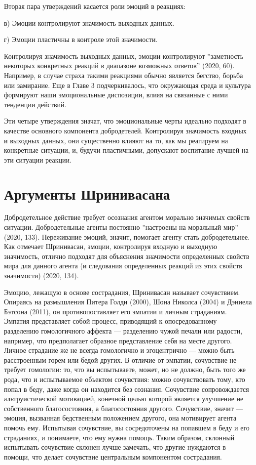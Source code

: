 \documentclass[11pt]{book}
\begin{document}
Вторая пара утверждений касается роли эмоций в реакциях:

в) Эмоции контролируют значимость выходных данных.

г) Эмоции пластичны в контроле этой значимости.

Контролируя значимость выходных данных, эмоции контролируют ''заметность некоторых конкретных реакций в диапазоне возможных ответов'' (2020, 60). Например, в случае страха такими реакциями обычно является бегство, борьба или замирание. Еще в Главе 3 подчеркивалось, что окружающая среда и культура формируют наши эмоциональные диспозиции, влияя на связанные с ними тенденции действий.

Эти четыре утверждения значат, что эмоциональные черты идеально подходят в качестве основного компонента добродетелей. Контролируя значимость входных и выходных данных, они существенно влияют на то, как мы реагируем на конкретные ситуации, и, будучи пластичными, допускают воспитание лучшей на эти ситуации реакции.

\section{Аргументы Шринивасана}

Добродетельное действие требует осознания агентом морально значимых свойств ситуации. Добродетельные агенты постоянно ''настроены на моральный мир'' (2020, 133). Переживание эмоций, значит, помогает агенту стать добродетельнее. Как отмечает Шринивасан, эмоции, контролируя входную и выходную значимость, отлично подходят для объяснения значимости определенных свойств мира для данного агента (и следования определенных реакций из этих свойств значимости) (2020, 134).

Эмоцию, лежащую в основе сострадания, Шринивасан называет сочувствием. Опираясь на размышления Питера Голди (2000), Шона Николса (2004) и Дэниела Бэтсона (2011), он противопоставляет его эмпатии и личным страданиям. Эмпатия представляет собой процесс, приводящий к опосредованному разделению гомологичного аффекта --- разделению чужой печали или радости, например, что предполагает образное представление себя на месте другого. Личное страдание же не всегда гомологично и эгоцентрично --- можно быть расстроенным горем или бедой других. В отличие от эмпатии, сочувствие не требует гомологии: то, что вы испытываете, может, но не должно, быть того же рода, что и испытываемое объектом сочувствия: можно сочувствовать тому, кто попал в беду, даже когда он находится без сознания. Сочувствие сопровождается альтруистической мотивацией, конечной целью которой является улучшение не собственного благосостояния, а благосостояния другого. Сочувствие, значит --- эмоция, вызванная бедственным положением другого, она мотивирует агента помочь ему. Испытывая сочувствие, вы сосредоточены на попавшем в беду и его страданиях, и понимаете, что ему нужна помощь. Таким образом, склонный испытывать сочувствие склонен лучше замечать, что другие нуждаются в помощи, что делает сочувствие центральным компонентом сострадания.
\end{document}
